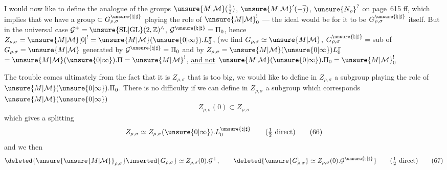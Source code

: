 I would now like to define the analogue of the groups
$\unsure{M|\mathcal{M}}(\tfrac12)$, $\unsure{M|\mathcal{M}}'(-\overline j)$,
$\unsure{N_\rho}^{?}$
on page~615 ff,
which implies that we have a group $\subset G_{\rho,\sigma}^{\unsure{\natural|\sharp}}$
playing the role of $\unsure{M|\mathcal{M}}^{!}_0$ --- the ideal would be for it to be
$G_{\rho,\sigma}^{\unsure{\natural|\sharp}}$ itself.
But in the universal case
$\mathcal{G}^+=\unsure{\mathrm{SL}|\mathrm{GL}}(2,\mathbb Z)^\wedge$,
$\mathcal{G}^{\unsure{\natural|\sharp}}=\Pi_0$,
hence
$Z_{\rho,\sigma}=\unsure{M|\mathcal{M}}[0]^{!}=\unsure{M|\mathcal{M}}(\unsure{0|\infty}).L_0^\pi$,
(we find $G_{\rho,\sigma}\simeq \unsure{M|\mathcal{M}}$,
$G_{\rho,\sigma}^{\unsure{\natural|\sharp}}={}$sub
of $G_{\rho,\sigma}=\unsure{M|\mathcal{M}}$ generated by
$\mathcal{G}^{\unsure{\natural|\sharp}}=\Pi_0$
and by $Z_{\rho,\sigma}=\unsure{M|\mathcal{M}}(\unsure{0|\infty})L_0^\pi$
$=\unsure{M|\mathcal{M}}(\unsure{0|\infty}).\Pi=\unsure{M|\mathcal{M}}^{!}$,
\uline{and not} $\unsure{M|\mathcal{M}}(\unsure{0|\infty}).\Pi_0=\unsure{M|\mathcal{M}}^{!}_0$\deleted{$\unsure{!}$}

The trouble comes ultimately from the fact that it is $Z_{\rho,\sigma}$
that is too big, we would like to define in $Z_{\rho,\sigma}$ a subgroup
playing the role of $\unsure{M|\mathcal{M}}(\unsure{0|\infty}).\Pi_0$. There is no difficulty if we can define
in  $Z_{\rho,\sigma}$ a subgroup which
corresponds  $\unsure{M|\mathcal{M}}(\unsure{0|\infty})$
\[
Z_{\rho,\sigma}(0)\subset Z_{\rho,\sigma}
\tag{65}
\]
which gives a splitting
\[
Z_{\rho,\sigma}\simeq Z_{\rho,\sigma}(\unsure{0|\infty}).L_0^{\unsure{\natural|\sharp}}
\qquad (\tfrac12\ \text{direct})
\tag{66}
\]
and we  then
\[
\deleted{\unsure{\unsure{M|\mathcal{M}}}_{\rho,\sigma}}\inserted{G_{\rho,\sigma}}
\simeq Z_{\rho,\sigma}(0).\mathcal{G}^+,
\qquad
\deleted{\unsure{G_{\rho,\sigma}^{\natural}}\simeq
Z_{\rho,\sigma}(0).\mathcal{G}^{\unsure{\natural|\sharp}}}
\qquad (\tfrac12\ \text{direct})
\tag{67}
\]



